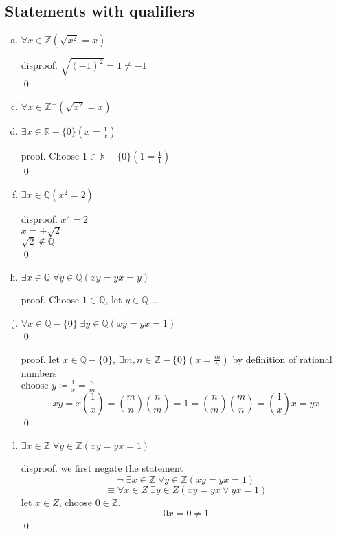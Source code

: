 \documentclass[12pt]{book}
\newcommand{\Z}{\mathbb{Z}}
\newcommand{\R}{\mathbb{R}}
\newcommand{\Q}{\mathbb{Q}}
\newcommand{\paren}[1]{\left( #1 \right)}
\begin{document}
\subsection{Statements with qualifiers}
\begin{enumerate}[a.]
    \item $\forall x \in \mathbb{Z}\left( \sqrt{x^2}=x \right)$
        \item[disproof.] $ \sqrt{\paren{-1}^2} = 1 \neq -1$\\
        \qed
    \item $\forall x \in \Z^+ \paren{\sqrt{x^2}=x}$
    \item $\exists x \in \R - \{0\}\paren{x = \frac{1}{x}}$
        \item[proof.] Choose $1 \in \R - \{ 0 \} \paren{1=\frac{1}{1}}$\\
        \qed
    \item $\exists x \in \Q \paren{x^2 = 2} $
        \item[disproof.]$x^2 = 2$\\
                    $x = \pm \sqrt{2}$\\
                    $\sqrt{2} \notin \Q$\\
                    \qed
    \item $\exists x \in \Q \; \forall y \in \Q \paren{xy=yx=y}$
        \item[proof.] Choose $1 \in \Q$, let $y \in \Q$ \ldots
    \item $\forall x \in \Q - \{0\} \; \exists y \in \Q \paren{xy=yx=1}$
            \\ \qed
        \item[proof.] let $x \in \Q -\{0\}$, $\exists m,n \in \Z -\{0 \}\paren{x = \frac{m}{n}}$ by definition of rational numbers\\
        \(
        \text{choose } y \coloneqq \frac{1}{x} = \frac{n}{m}
        \)
        \[
        xy = x\paren{\frac{1}{x}} = \paren{\frac{m}{n}} \paren{\frac{n}{m}}
        =1 = \paren{\frac{n}{m}}\paren{\frac{m}{n}} = \paren{\frac{1}{x}}x = yx
        \]
        \qed
    \item $\exists x \in \Z \; \forall y \in \Z \paren{xy=yx=1}$
        \item[disproof.]we first negate the statement 
        \[
        \neg \; \exists x \in \Z \; \forall y \in \Z \paren{xy=yx=1}
        \]
        \[
        \equiv \forall x \in Z \; \exists y \in Z \paren{xy=yx \vee yx=1}
        \]
        let $x \in Z$, choose $0 \in \Z$.\\
        \[
        0x=0\neq 1
        \]
        \qed
\end{enumerate}
\end{document}
